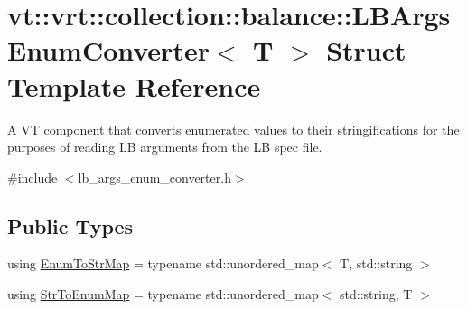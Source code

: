 \hypertarget{structvt_1_1vrt_1_1collection_1_1balance_1_1_l_b_args_enum_converter}{}\section{vt\+:\+:vrt\+:\+:collection\+:\+:balance\+:\+:L\+B\+Args\+Enum\+Converter$<$ T $>$ Struct Template Reference}
\label{structvt_1_1vrt_1_1collection_1_1balance_1_1_l_b_args_enum_converter}


A VT component that converts enumerated values to their stringifications for the purposes of reading LB arguments from the LB spec file.  




{\ttfamily \#include $<$lb\+\_\+args\+\_\+enum\+\_\+converter.\+h$>$}

\subsection*{Public Types}
\begin{DoxyCompactItemize}
\item 
using \hyperlink{structvt_1_1vrt_1_1collection_1_1balance_1_1_l_b_args_enum_converter_ab4e2b0c525c1ea76f18f2ff45733f3c4}{Enum\+To\+Str\+Map} = typename std\+::unordered\+\_\+map$<$ T, std\+::string $>$
\item 
using \hyperlink{structvt_1_1vrt_1_1collection_1_1balance_1_1_l_b_args_enum_converter_a4addf8d7b128d0e5de627e60b4c299bf}{Str\+To\+Enum\+Map} = typename std\+::unordered\+\_\+map$<$ std\+::string, T $>$
\end{DoxyCompactItemize}
